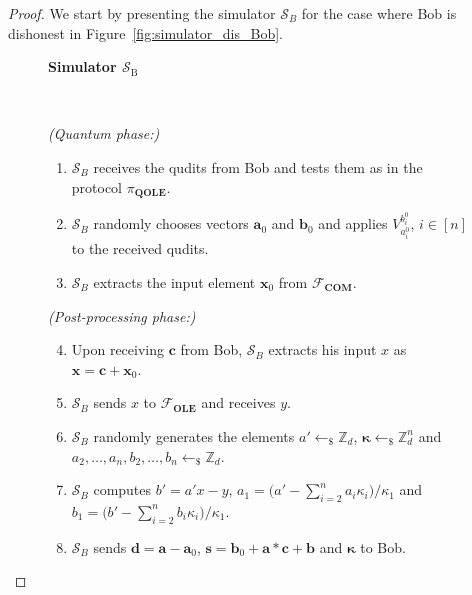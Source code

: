 \begin{proof}
We start by presenting the simulator $\mathcal{S}_B$ for the case where Bob is dishonest in Figure~\ref{fig:simulator_dis_Bob}.

\begin{figure}[h!]
    \centering
        \begin{tcolorbox}
            
            \centerline{\textbf{Simulator $\mathcal{S}_{\text{B}}$}}
            
            \

    \textit{(Quantum phase:)}
    
    \begin{enumerate}
        \item $\mathcal{S}_B$ receives the qudits from Bob and tests them as in the protocol $\mathcal{\pi}_{\textbf{QOLE}}$.
        \item $\mathcal{S}_B$ randomly chooses vectors $\bm{a}_0$ and $\bm{b}_0$ and applies  $V^{b^0_i}_{a^0_i}$, $i\in [n]$ to the received qudits.
        \item $\mathcal{S}_B$ extracts the input element $\bm{x}_0$  from  $\mathcal{F}_{\textbf{COM}}$.
    \end{enumerate}
    
    \textit{(Post-processing phase:)}
     
    \begin{enumerate}
    \setcounter{enumi}{3} 
        \item Upon receiving $\bm{c}$ from Bob, $\mathcal{S}_B$ extracts his input $x$ as  $\bm{x}=\bm{c} + \bm{x}_0$.
        \item $\mathcal{S}_B$ sends $x$ to  $\mathcal{F}_{\textbf{OLE}}$ and receives $y$.
        \item $\mathcal{S}_B$ randomly generates the elements $a'\leftarrow_{\$} \mathbb{Z}_d$, $\bm{\kappa}\leftarrow_{\$} \mathbb{Z}^n_d$ and $a_2, \ldots, a_n, b_2, \ldots, b_n\leftarrow_{\$}\mathbb{Z}_d$. 
        \item $\mathcal{S}_B$ computes $b' = a'x - y$, $a_1 = \big(a' - \sum_{i=2}^{n} a_i \kappa_i\big)/\kappa_1$ and $b_1 = \big(b' - \sum_{i=2}^{n} b_i \kappa_i\big)/\kappa_1$.
        \item  $\mathcal{S}_B$ sends $\bm{d} = \bm{a} - \bm{a}_0$, $\bm{s} = \bm{b}_0 + \bm{a} * \bm{c} + \bm{b}$ and $\bm{\kappa}$ to Bob.
        
        
    \end{enumerate} 
        

\end{tcolorbox}
\end{figure}
\end{proof}
